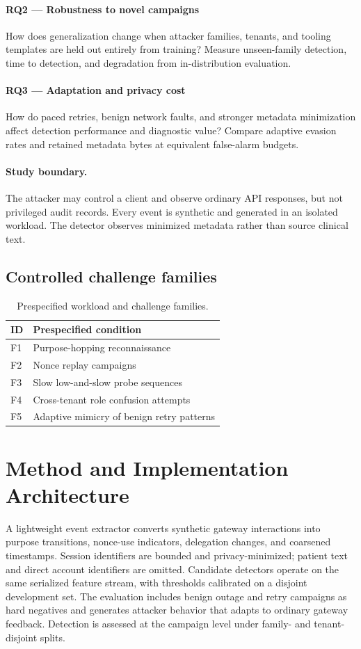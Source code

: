 \documentclass[11pt,a4paper]{article}
\begin{document}
\paragraph{RQ2 — Robustness to novel campaigns} How does generalization change when attacker families, tenants, and tooling templates are held out entirely from training? Measure unseen-family detection, time to detection, and degradation from in-distribution evaluation.

\paragraph{RQ3 — Adaptation and privacy cost} How do paced retries, benign network faults, and stronger metadata minimization affect detection performance and diagnostic value? Compare adaptive evasion rates and retained metadata bytes at equivalent false-alarm budgets.

\paragraph{Study boundary.} The attacker may control a client and observe ordinary API responses, but not privileged audit records. Every event is synthetic and generated in an isolated workload. The detector observes minimized metadata rather than source clinical text.

\subsection{Controlled challenge families}
\begin{table}[ht]
\centering\small
\caption{Prespecified workload and challenge families.}
\begin{tabularx}{\linewidth}{@{}lX@{}}\toprule
ID & Prespecified condition \\ \midrule
F1 & Purpose-hopping reconnaissance \\ 
F2 & Nonce replay campaigns \\ 
F3 & Slow low-and-slow probe sequences \\ 
F4 & Cross-tenant role confusion attempts \\ 
F5 & Adaptive mimicry of benign retry patterns \\ 
\bottomrule\end{tabularx}\end{table}

\section{Method and Implementation Architecture}
A lightweight event extractor converts synthetic gateway interactions into purpose transitions, nonce-use indicators, delegation changes, and coarsened timestamps. Session identifiers are bounded and privacy-minimized; patient text and direct account identifiers are omitted. Candidate detectors operate on the same serialized feature stream, with thresholds calibrated on a disjoint development set. The evaluation includes benign outage and retry campaigns as hard negatives and generates attacker behavior that adapts to ordinary gateway feedback. Detection is assessed at the campaign level under family- and tenant-disjoint splits.
\end{document}
